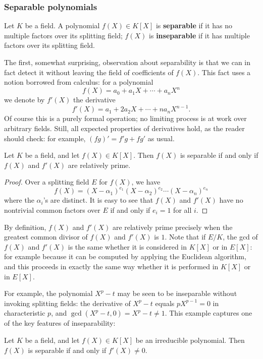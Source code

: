 \subsubsection{Separable polynomials}
\begin{definition}
Let $K$ be a field. A polynomial $f(X)\in K[X]$ is \textbf{separable} if it has no multiple factors over its splitting field; $f(X)$ is \textbf{inseparable} if it has multiple factors over its splitting field.
\end{definition}
The first, somewhat surprising, observation about separability is that we can in fact detect it without leaving the field of coefficients of $f(X)$. This fact uses a notion borrowed from calculus: for a polynomial
\[f(X)=a_0+a_1X+\cdots+a_nX^n\]
we denote by $f'(X)$ the derivative
\[f'(X)=a_1+2a_2X+\cdots+na_nX^{n-1}.\]
Of course this is a purely formal operation; no limiting process is at work over arbitrary fields. Still, all expected properties of derivatives hold, as the reader should check: for example, $(fg)'=f'g+fg'$ as usual.
\begin{proposition}\label{poloynomial separable iff f' coprime to f}
Let $K$ be a field, and let $f(X)\in K[X]$. Then $f(X)$ is separable if and only if $f(X)$ and $f'(X)$ are relatively prime.
\end{proposition}
\begin{proof}
Over a splitting field $E$ for $f(X)$, we have
\[f(X)=(X-\alpha_1)^{e_1}(X-\alpha_2)^{e_2}\cdots(X-\alpha_n)^{e_n}\]
where the $\alpha_i$'s are distinct. It is easy to see that $f(X)$ and $f'(X)$ have no nontrivial common factors over $E$ if and only if $e_i=1$ for all $i$.
\end{proof}
By definition, $f(X)$ and $f'(X)$ are relatively prime precisely when the greatest common divisor of $f(X)$ and $f'(X)$ is $1$. Note that if $E/K$, the gcd of $f(X)$ and $f'(X)$ is the same whether it is considered in $K[X]$ or in $E[X]$: for example because it can be computed by applying the Euclidean algorithm, and this proceeds in exactly the same way whether it is performed in $K[X]$ or in $E[X]$.\par
For example, the polynomial $X^p-t$ may be seen to be inseparable without invoking splitting fields: the derivative of $X^p-t$ equals $pX^{p-1}=0$ in characteristic $p$, and $\gcd(X^p-t,0)=X^p-t\neq 1$. This example captures one of the key features of inseparability:
\begin{corollary}\label{insepara zero}
Let $K$ be a field, and let $f(X)\in K[X]$ be an irreducible polynomial. Then $f(X)$ is separable if and only if $f'(X)\neq 0$.
\end{corollary}
